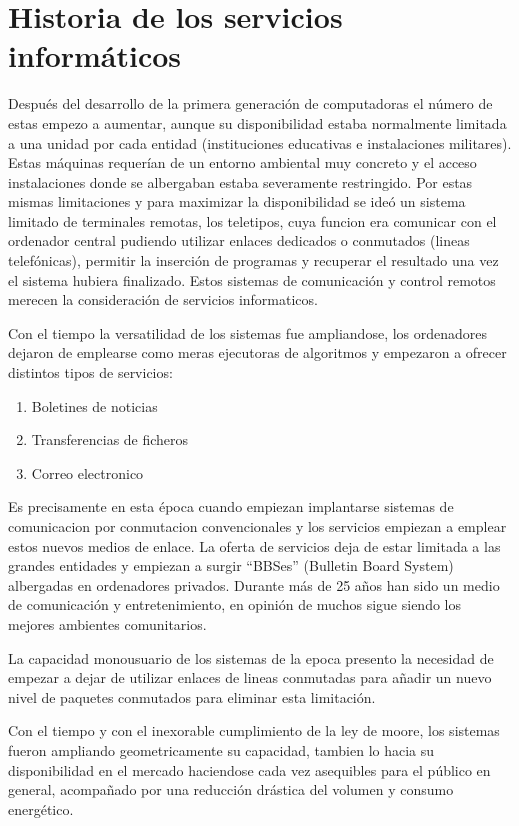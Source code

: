 \documentclass[a4paper,spanish,12pt]{book}
\begin{document}
\section{Historia de los servicios informáticos}
Despu\'es del desarrollo de la primera generación de computadoras el número de estas empezo a aumentar, aunque su disponibilidad estaba normalmente limitada a una unidad por cada entidad (instituciones educativas e instalaciones militares). Estas máquinas requerían de un entorno ambiental muy concreto y el acceso instalaciones donde se albergaban estaba severamente restringido. Por estas mismas limitaciones y para maximizar la disponibilidad se ideó un sistema limitado de terminales remotas, los teletipos, cuya funcion era comunicar con el ordenador central pudiendo utilizar enlaces dedicados o conmutados (lineas telefónicas), permitir la inserción de programas y recuperar el resultado una vez el sistema hubiera finalizado. Estos sistemas de comunicación y control remotos merecen la consideración de servicios informaticos.

Con el tiempo la versatilidad de los sistemas fue ampliandose, los ordenadores dejaron de emplearse como meras ejecutoras de algoritmos y empezaron a ofrecer distintos tipos de servicios:
\begin{enumerate}
	\item Boletines de noticias
	\item Transferencias de ficheros
	\item Correo electronico
\end{enumerate}
Es precisamente en esta \'epoca cuando empiezan implantarse sistemas de comunicacion por conmutacion convencionales y los servicios empiezan a emplear estos nuevos medios de enlace. La oferta de servicios deja de estar limitada a las grandes entidades y empiezan a surgir ``BBSes'' (Bulletin Board System) albergadas en ordenadores privados. Durante más de 25 años han sido un medio de comunicación y entretenimiento, en opinión de muchos sigue siendo los mejores ambientes comunitarios. 

La capacidad monousuario de los sistemas de la epoca presento la necesidad de empezar a dejar de utilizar enlaces de lineas conmutadas para añadir un nuevo nivel de paquetes conmutados para eliminar esta limitación.

Con el tiempo y con el inexorable cumplimiento de la ley de moore, los sistemas fueron ampliando geometricamente su capacidad, tambien lo hacia su disponibilidad en el mercado haciendose cada vez asequibles para el público en general, acompañado por una reducción drástica del volumen y consumo energ\'etico.  
\end{document}
